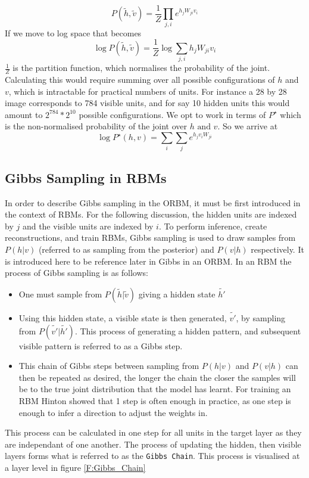   $$ P(\tilde{h},\tilde{v}) = \frac{1}{Z} \prod_{j,i} e^{h_jW_{ji}v_i} $$
  If we move to log space that becomes
  $$ \log P(\tilde{h},\tilde{v}) = \frac{1}{Z} \log \sum_{j,i} h_j W_{ji} v_i $$
  $\frac{1}{Z} $ is the partition function, which normalises the probability of the joint. Calculating this would require summing over all possible configurations of $h$ and $v$, which is intractable for practical numbers of units. For instance a 28 by 28 image corresponds to 784 visible units, and for say 10 hidden units this would amount to $2^{784} * 2^{10} $ possible configurations. We opt to work in terms of $P^\star$ which is the non-normalised probability of the joint over $h \text{ and } v$.
  So we arrive at
  \begin{equation}\label{eq:LogPJoint}
     \log P^\star(h, v) = \sum_i \sum_j e^{h_j v_i W_{ji}}
  \end{equation}

  \subsection{Gibbs Sampling in RBMs}

  In order to describe Gibbs sampling in the ORBM, it must be first introduced in the context of RBMs. For the following discussion, the hidden units are indexed by $j$ and the visible units are indexed by $i$.
  To perform inference, create reconstructions, and train RBMs, Gibbs sampling is used to draw samples from $P(h|v)$ (referred to as sampling from the posterior) and $P(v|h)$ respectively. It is introduced here to be reference later in Gibbs in an ORBM. In an RBM the process of Gibbs sampling is as follows:
  \begin{itemize}
    \item One must sample from $P(\tilde{h}|\tilde{v})$ giving a hidden state $\tilde{h'}$
    \item Using this hidden state, a visible state is then generated, $\tilde{v'}$, by sampling from $P(\tilde{v'}|\tilde{h'})$. This process of generating a hidden pattern, and subsequent visible pattern is referred to as a Gibbs step.
    \item This chain of Gibbs steps between sampling from $P(h|v)$ and $P(v|h)$ can then be repeated as desired, the longer the chain the closer the samples will be to the true joint distribution that the model has learnt. For training an RBM Hinton showed that 1 step is often enough in practice, as one step is enough to infer a direction to adjust the weights in.
  \end{itemize}
   This process can be calculated in one step for all units in the target layer as they are independant of one another. The process of updating the hidden, then visible layers forms what is referred to as the \texttt{Gibbs Chain}.  This process is visualised at a layer level in figure \ref{F:Gibbs_Chain}

